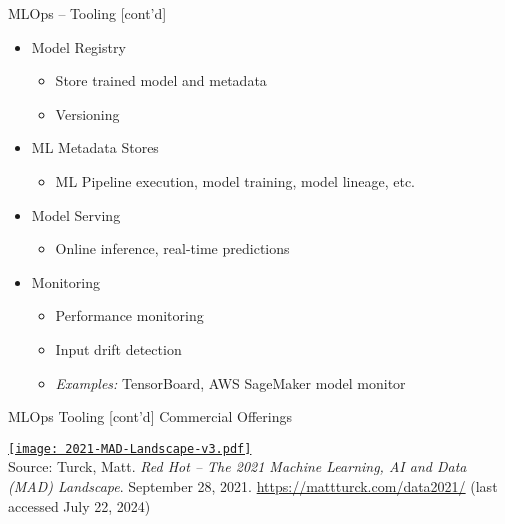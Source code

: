 \documentclass[ignorenonframetext,xcolor=x11names]{beamer}
\begin{document}
\begin{frame}{MLOps -- Tooling \small [cont'd]}
\begin{itemize}
  \item Model Registry
  \begin{itemize}
  \footnotesize
      \item Store trained model and metadata
      \item Versioning
  \end{itemize}
  \item ML Metadata Stores
  \begin{itemize}
  \footnotesize
     \item ML Pipeline execution, model training, model lineage, etc.
  \end{itemize}
  \item Model Serving
  \begin{itemize}
  \footnotesize
     \item Online inference, real-time predictions
  \end{itemize}
  \item Monitoring
  \begin{itemize}
  \footnotesize
     \item Performance monitoring
     \item Input drift detection
     \item \emph{Examples:} TensorBoard, AWS SageMaker model monitor
  \end{itemize}
\end{itemize}
\end{frame}


\begin{frame}{MLOps Tooling \small [cont'd]}
\centering
\large Commercial Offerings

\href{https://mattturck.com/wp-content/uploads/2021/12/2021-MAD-Landscape-v3.pdf}{
\texttt{[image: 2021-MAD-Landscape-v3.pdf]}} \\

\scriptsize Source: Turck, Matt. \textit{Red Hot -- The 2021 Machine Learning, AI and Data (MAD) Landscape}. September 28, 2021. \url{https://mattturck.com/data2021/} (last accessed July 22, 2024)
\end{frame}
\end{document}
